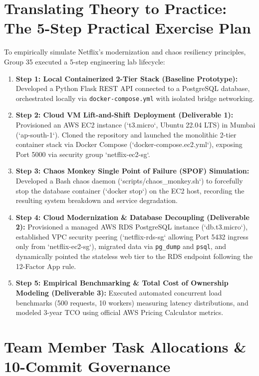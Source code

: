 \documentclass[11pt,a4paper]{article}
\begin{document}
\section{Translating Theory to Practice: The 5-Step Practical Exercise Plan}

To empirically simulate Netflix's modernization and chaos resiliency principles, Group 35 executed a 5-step engineering lab lifecycle:

\begin{enumerate}[leftmargin=*]
    \item \textbf{Step 1: Local Containerized 2-Tier Stack (Baseline Prototype):} Developed a Python Flask REST API connected to a PostgreSQL database, orchestrated locally via \texttt{docker-compose.yml} with isolated bridge networking.
    \item \textbf{Step 2: Cloud VM Lift-and-Shift Deployment (Deliverable 1):} Provisioned an AWS EC2 instance (`t3.micro`, Ubuntu 22.04 LTS) in Mumbai (`ap-south-1`). Cloned the repository and launched the monolithic 2-tier container stack via Docker Compose (`docker-compose.ec2.yml`), exposing Port 5000 via security group `netflix-ec2-sg`.
    \item \textbf{Step 3: Chaos Monkey Single Point of Failure (SPOF) Simulation:} Developed a Bash chaos daemon (`scripts/chaos_monkey.sh`) to forcefully stop the database container (`docker stop`) on the EC2 host, recording the resulting system breakdown and service degradation.
    \item \textbf{Step 4: Cloud Modernization \& Database Decoupling (Deliverable 2):} Provisioned a managed AWS RDS PostgreSQL instance (`db.t3.micro`), established VPC security peering (`netflix-rds-sg` allowing Port 5432 ingress only from `netflix-ec2-sg`), migrated data via \texttt{pg\_dump} and \texttt{psql}, and dynamically pointed the stateless web tier to the RDS endpoint following the 12-Factor App rule.
    \item \textbf{Step 5: Empirical Benchmarking \& Total Cost of Ownership Modeling (Deliverable 3):} Executed automated concurrent load benchmarks (500 requests, 10 workers) measuring latency distributions, and modeled 3-year TCO using official AWS Pricing Calculator metrics.
\end{enumerate}

\section{Team Member Task Allocations \& 10-Commit Governance}
\end{document}
